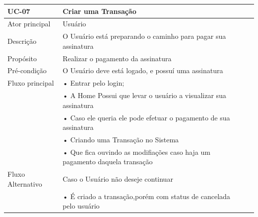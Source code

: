 \documentclass[a4paper,12pt]{article}
\begin{document}
\begin{table}[ht]
    \centering
    \begin{tabular}{|p{3.5cm}|p{10cm}|p{7cm}|}
        \hline
        \textbf{UC-07}                     & \textbf{Criar uma Transação}                                                                \\
        \hline

        \multirow{1}{*}{Ator principal}    & Usuário                                                                                     \\
        \hline
        \multirow{1}{*}{Descrição}         & O Usuário está preparando o caminho para pagar sua assinatura                               \\
        \hline

        \multirow{1}{*}{Propósito}         & Realizar o pagamento da assinatura                                                          \\
        \hline

        \multirow{1}{*}{Pré-condição}      & O Usuário deve está logado, e possuí uma assinatura                                         \\
        \hline

        \multirow{1}{*}{Fluxo principal}
                                           & • Entrar pelo login;                                                                        \\
                                           & • A Home Possui que levar o usuário a visualizar sua assinatura                             \\
                                           & • Caso ele queria ele pode efetuar o pagamento de sua assinatura                            \\
                                           & • Criando uma Transação no Sistema                                                          \\
                                           & • Que fica ouvindo as modifiações caso haja um  pagamento daquela transação                 \\
        \hline

        \multirow{1}{*}{Fluxo Alternativo} & Caso o Usuário não deseje continuar                                                         \\
                                           & • É criado a transação,porém com status de cancelada pelo usuário                           \\
        \hline


\end{tabular}
\end{table}
\end{document}
